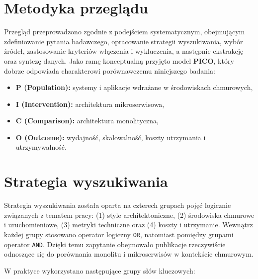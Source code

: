 \section{Metodyka przeglądu}

Przegląd przeprowadzono zgodnie z podejściem systematycznym, obejmującym zdefiniowanie pytania badawczego, opracowanie strategii wyszukiwania, wybór źródeł, zastosowanie kryteriów włączenia i wykluczenia, a następnie ekstrakcję oraz syntezę danych. Jako ramę konceptualną przyjęto model \textbf{PICO}, który dobrze odpowiada charakterowi porównawczemu niniejszego badania:

\begin{itemize}
    \item \textbf{P (Population):} systemy i aplikacje wdrażane w środowiskach chmurowych,
    \item \textbf{I (Intervention):} architektura mikroserwisowa,
    \item \textbf{C (Comparison):} architektura monolityczna,
    \item \textbf{O (Outcome):} wydajność, skalowalność, koszty utrzymania i utrzymywalność.
\end{itemize}


\section{Strategia wyszukiwania}

Strategia wyszukiwania została oparta na czterech grupach pojęć logicznie związanych z tematem pracy: (1) style architektoniczne, (2) środowiska chmurowe i uruchomieniowe, (3) metryki techniczne oraz (4) koszty i utrzymanie. Wewnątrz każdej grupy stosowano operator logiczny \texttt{OR}, natomiast pomiędzy grupami operator \texttt{AND}. Dzięki temu zapytanie obejmowało publikacje rzeczywiście odnoszące się do porównania monolitu i mikroserwisów w kontekście chmurowym.

W praktyce wykorzystano następujące grupy słów kluczowych:

